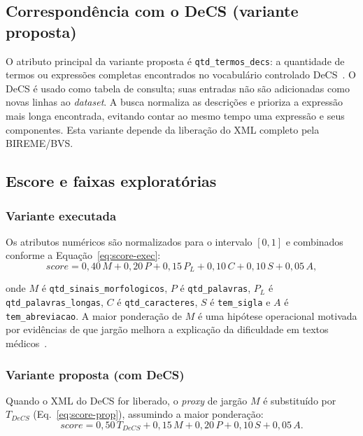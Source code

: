 \documentclass[12pt]{article}
\begin{document}
\subsection{Correspondência com o DeCS (variante proposta)}
\label{sec:decs}

O atributo principal da variante proposta é \texttt{qtd\_termos\_decs}: a
quantidade de termos ou expressões completas encontrados no vocabulário
controlado DeCS~\cite{decs}. O DeCS é usado como tabela de consulta; suas
entradas não são adicionadas como novas linhas ao \textit{dataset}. A busca
normaliza as descrições e prioriza a expressão mais longa encontrada,
evitando contar ao mesmo tempo uma expressão e seus componentes. Esta
variante depende da liberação do XML completo pela BIREME/BVS.

\subsection{Escore e faixas exploratórias}

\subsubsection{Variante executada}
\label{sec:score-exec}

Os atributos numéricos são normalizados para o intervalo $[0,1]$ e
combinados conforme a Equação~\ref{eq:score-exec}:
\begin{equation}
\label{eq:score-exec}
\textit{score} = 0{,}40\,M + 0{,}20\,P + 0{,}15\,P_L + 0{,}10\,C +
0{,}10\,S + 0{,}05\,A,
\end{equation}

\noindent onde $M$ é \texttt{qtd\_sinais\_morfologicos}, $P$ é
\texttt{qtd\_palavras}, $P_L$ é \texttt{qtd\_palavras\_longas}, $C$ é
\texttt{qtd\_caracteres}, $S$ é \texttt{tem\_sigla} e $A$ é
\texttt{tem\_abreviacao}. A maior ponderação de $M$ é uma hipótese
operacional motivada por evidências de que jargão melhora a explicação da
dificuldade em textos médicos~\cite{jiang2024medreadme}.

\subsubsection{Variante proposta (com DeCS)}
\label{sec:score-prop}

Quando o XML do DeCS for liberado, o \textit{proxy} de jargão $M$ é
substituído por $T_{DeCS}$ (Eq.~\ref{eq:score-prop}), assumindo a maior
ponderação:
\begin{equation}
\label{eq:score-prop}
\textit{score} = 0{,}50\,T_{DeCS} + 0{,}15\,M + 0{,}20\,P +
0{,}10\,S + 0{,}05\,A.
\end{equation}
\end{document}
